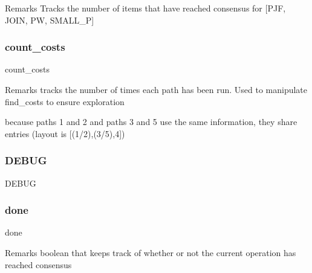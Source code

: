 \begin{DoxyRemark}{Remarks}
Tracks the number of items that have reached consensus for \mbox{[}P\+JF, J\+O\+IN, PW, S\+M\+A\+L\+L\+\_\+P\mbox{]} 
\end{DoxyRemark}
\mbox{\label{classdynamicfilterapp_1_1models_1_1_join_a6760579c97fc985690cdd3386effeb3c}} 
\subsubsection{\texorpdfstring{count\_costs}{count\_costs}}
{\footnotesize\ttfamily count\+\_\+costs}

\begin{DoxyRemark}{Remarks}
tracks the number of times each path has been run. Used to manipulate find\+\_\+costs to ensure exploration 

because paths 1 and 2 and paths 3 and 5 use the same information, they share entries (layout is \mbox{[}(1/2),(3/5),4\mbox{]}) 
\end{DoxyRemark}
\mbox{\label{classdynamicfilterapp_1_1models_1_1_join_a73585d7121de037cf2e2ca12b27eb83e}} 
\subsubsection{\texorpdfstring{DEBUG}{DEBUG}}
{\footnotesize\ttfamily D\+E\+B\+UG}

\mbox{\label{classdynamicfilterapp_1_1models_1_1_join_ad604cff3eb5d475cdc9f8eb5ab570fee}} 
\subsubsection{\texorpdfstring{done}{done}}
{\footnotesize\ttfamily done}

\begin{DoxyRemark}{Remarks}
boolean that keeps track of whether or not the current operation has reached consensus 
\end{DoxyRemark}
\mbox{\label{classdynamicfilterapp_1_1models_1_1_join_a7e81f566be5597c15f002809e8b1118c}} 
